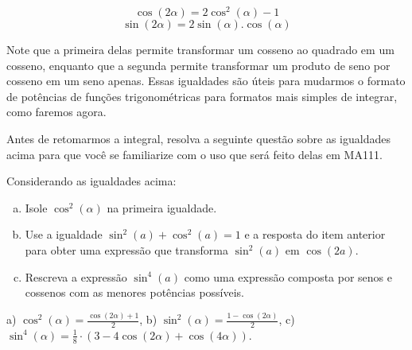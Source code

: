 \documentclass[main_estudante.tex]{subfiles}
\begin{document}
\begin{shaded*}
$$\cos(2\alpha) = 2\cos^2(\alpha)-1$$
$$\sin(2\alpha) = 2\sin(\alpha).\cos(\alpha)$$
\end{shaded*}

Note que a primeira delas permite transformar um cosseno ao quadrado em um cosseno, enquanto que a segunda permite transformar um produto de seno por cosseno em um seno apenas. Essas igualdades são úteis para mudarmos o formato de potências de funções trigonométricas para formatos mais simples de integrar, como faremos agora.

Antes de retomarmos a integral, resolva a seguinte questão sobre as igualdades acima para que você se familiarize com o uso que será feito delas em MA111.


\begin{questao}
Considerando as igualdades acima:
\begin{enumerate}[a)]
\item Isole $\cos^2(\alpha)$ na primeira igualdade.
\item Use a igualdade $\sin^2(a) + \cos^2(a)=1$ e a resposta do item anterior para obter uma expressão que transforma $\sin^2(a)$ em $\cos(2a)$.
\item Rescreva a expressão $\sin^4(a)$ como uma expressão composta por senos e cossenos com as menores potências possíveis.
\end{enumerate}
\end{questao}

\begin{gabarito}
	\begin{gabaritoQuestao}
		a) $\cos^2(\alpha)=\frac{\cos(2\alpha)+1}{2}$, b) $\sin^2(\alpha)=\frac{1-\cos(2\alpha)}{2}$, c) $\sin^4(\alpha)=\frac{1}{8} \cdot (3-4\cos(2\alpha)+\cos(4\alpha))$.
	\end{gabaritoQuestao}
\end{gabarito}
\end{document}
